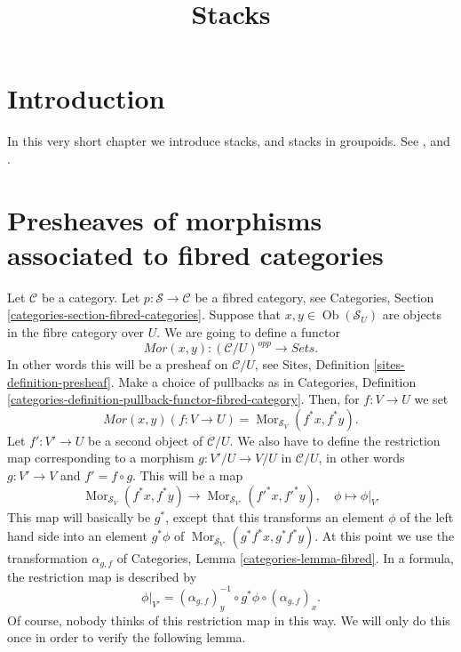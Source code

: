 \documentclass{stacks-project}
\theoremstyle{plain}
\theoremstyle{definition}
\theoremstyle{remark}
\numberwithin{equation}{subsection}
\def\Mor{\mathop{\mathrm{Mor}}\nolimits}
\def\Ob{\mathop{\mathrm{Ob}}\nolimits}
\begin{document}
\title{Stacks}


\maketitle

\label{section-phantom}

\tableofcontents

\section{Introduction}
\label{section-introduction}

\noindent
In this very short chapter we introduce stacks, and
stacks in groupoids. See \cite{DM}, and \cite{Vis2}.


\section{Presheaves of morphisms associated to fibred categories}
\label{section-morphisms}

\noindent
Let $\mathcal{C}$ be a category.
Let $p : \mathcal{S} \to \mathcal{C}$ be a fibred category,
see Categories, Section \ref{categories-section-fibred-categories}.
Suppose that $x, y\in \Ob(\mathcal{S}_U)$ are
objects in the fibre category over $U$. We are going to define
a functor
$$
\mathit{Mor}(x, y) : (\mathcal{C}/U)^{opp} \longrightarrow \textit{Sets}.
$$
In other words this will be a presheaf on $\mathcal{C}/U$, see
Sites, Definition \ref{sites-definition-presheaf}.
Make a choice of pullbacks as in
Categories,
Definition \ref{categories-definition-pullback-functor-fibred-category}.
Then, for $f : V \to U$ we set
$$
\mathit{Mor}(x, y)(f : V \to U) =
\Mor_{\mathcal{S}_V}(f^\ast x, f^\ast y).
$$
Let $f' : V' \to U$ be a second object of $\mathcal{C}/U$.
We also have to define the restriction map corresponding to a
morphism $g : V'/U  \to V/U$ in $\mathcal{C}/U$,
in other words $g : V' \to V$ and $f' = f \circ g$.
This will be a map
$$
\Mor_{\mathcal{S}_V}(f^\ast x, f^\ast y)
\longrightarrow
\Mor_{\mathcal{S}_{V'}}({f'}^\ast x, {f'}^\ast y), \quad
\phi \longmapsto \phi|_{V'}
$$
This map will basically be $g^\ast$, except that this transforms
an element $\phi$ of the left hand side into an element
$g^\ast \phi$
of $\Mor_{\mathcal{S}_{V'}}(g^\ast f^\ast x, g^\ast f^\ast y)$.
At this point we use the transformation $\alpha_{g, f}$ of
Categories, Lemma \ref{categories-lemma-fibred}.
In a formula, the restriction map is described by
$$
\phi|_{V'} =
(\alpha_{g, f})_y^{-1} \circ
g^\ast \phi \circ
(\alpha_{g, f})_x.
$$
Of course, nobody thinks of this restriction map in this way.
We will only do this once in order to verify the following
lemma.
\end{document}
